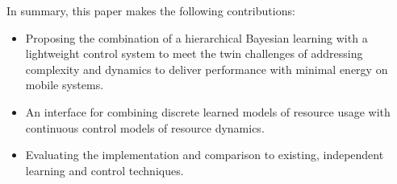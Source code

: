 In summary, this paper makes the following contributions:
\begin{itemize}
\item Proposing the combination of a hierarchical Bayesian learning with
  a lightweight control system to meet the twin challenges of
  addressing complexity and dynamics to deliver performance with
  minimal energy on mobile systems.
\item An interface for combining discrete learned models of resource
  usage with continuous control models of resource dynamics.
\item Evaluating the implementation and comparison to existing,
  independent learning and control techniques.
\end{itemize}


